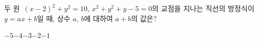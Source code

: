 두 원~$(x-2)^2+y^2=10$, $x^2+y^2+y-5=0$의 교점을 지나는 직선의 방정식이 $y=ax+b$일 때, 상수 $a$, $b$에 대하여 $a+b$의 값은?
\begin{choices32}{$-5$}{$-4$}{$-3$}{$-2$}{$-1$}\end{choices32}
